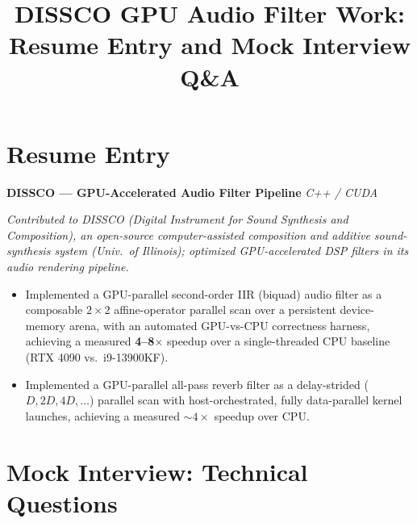 \documentclass[11pt]{article}
\title{\vspace{-2em}DISSCO GPU Audio Filter Work: Resume Entry and Mock Interview Q\&A}
\author{}
\date{}
\begin{document}
\maketitle
\vspace{-3em}

\section*{Resume Entry}

\textbf{DISSCO --- GPU-Accelerated Audio Filter Pipeline} \hfill \textit{C++ / CUDA}

\textit{Contributed to DISSCO (Digital Instrument for Sound Synthesis and Composition), an open-source computer-assisted composition and additive sound-synthesis system (Univ.\ of Illinois); optimized GPU-accelerated DSP filters in its audio rendering pipeline.}
\begin{itemize}[leftmargin=1.4em, itemsep=0.3em]
  \item Implemented a GPU-parallel second-order IIR (biquad) audio filter as a composable $2\times2$ affine-operator parallel scan over a persistent device-memory arena, with an automated GPU-vs-CPU correctness harness, achieving a measured \textbf{4--8$\times$} speedup over a single-threaded CPU baseline (RTX 4090 vs.\ i9-13900KF).
  \item Implemented a GPU-parallel all-pass reverb filter as a delay-strided ($D,2D,4D,\dots$) parallel scan with host-orchestrated, fully data-parallel kernel launches, achieving a measured \textbf{$\sim4\times$} speedup over CPU.
\end{itemize}

\section*{Mock Interview: Technical Questions}
\end{document}
